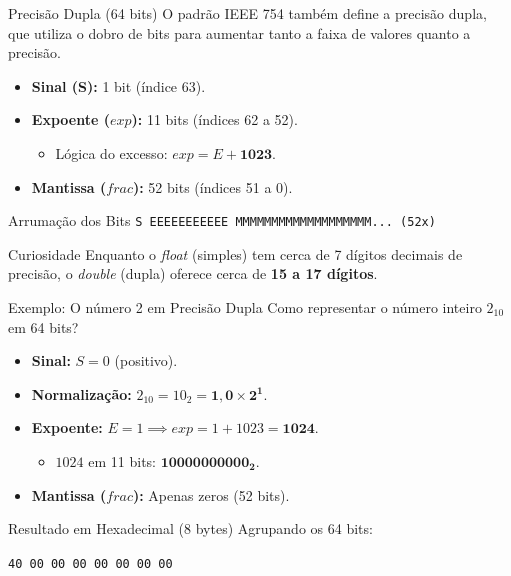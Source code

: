 \begin{frame}{Precisão Dupla (64 bits)}
    O padrão IEEE 754 também define a precisão dupla, que utiliza o dobro de bits para aumentar tanto a faixa de valores quanto a precisão.

    \begin{itemize}
        \item \textbf{Sinal (S):} 1 bit (índice 63).
        \item \textbf{Expoente ($exp$):} 11 bits (índices 62 a 52).
              \begin{itemize}
                  \item Lógica do excesso: $exp = E + \mathbf{1023}$.
              \end{itemize}
        \item \textbf{Mantissa ($frac$):} 52 bits (índices 51 a 0).
    \end{itemize}

    \begin{block}{Arrumação dos Bits}
        \texttt{S EEEEEEEEEEE MMMMMMMMMMMMMMMMMMM... (52x)}
    \end{block}

    \begin{exampleblock}{Curiosidade}
        Enquanto o \textit{float} (simples) tem cerca de 7 dígitos decimais de precisão, o \textit{double} (dupla) oferece cerca de \textbf{15 a 17 dígitos}.
    \end{exampleblock}
\end{frame}

\begin{frame}{Exemplo: O número 2 em Precisão Dupla}
    Como representar o número inteiro $2_{10}$ em 64 bits?

    \begin{itemize}
        \item \textbf{Sinal:} $S = 0$ (positivo).
        \item \textbf{Normalização:} $2_{10} = 10_2 = \mathbf{1,0 \times 2^1}$.
        \item \textbf{Expoente:} $E = 1 \implies exp = 1 + 1023 = \mathbf{1024}$.
              \begin{itemize}
                  \item $1024$ em 11 bits: $\mathbf{10000000000_2}$.
              \end{itemize}
        \item \textbf{Mantissa ($frac$):} Apenas zeros (52 bits).
    \end{itemize}

    \begin{block}{Resultado em Hexadecimal (8 bytes)}
        Agrupando os 64 bits:
        \begin{center}
            \Large \texttt{40 00 00 00 00 00 00 00}
        \end{center}
    \end{block}
\end{frame}

